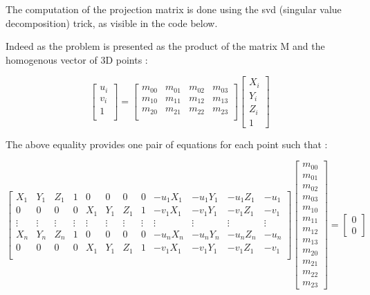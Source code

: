 \documentclass[a4paper,11pt]{article}
\begin{document}
The computation of the projection matrix is done using the svd (singular value decomposition) trick, as visible in the code below.

Indeed as the problem is presented as the product of the matrix M and the homogenous vector of 3D points : 

$$
\begin{bmatrix}
u_{i}  \\
v_{i}   \\
1  \\
\end{bmatrix} 
=
\begin{bmatrix}
m_{00} & m_{01}  & m_{02} & m_{03} \\
m_{10} & m_{11}  &  m_{12} & m_{13}  \\
m_{20} & m_{21}  & m_{22}  & m_{23} \\
\end{bmatrix}
\begin{bmatrix}
X_{i} \\
Y_{i}  \\
Z_{i}  \\
1
\end{bmatrix}
$$

The above equality provides one pair of equations for each point such that :

$$
\left[
\begin{array}{cccccccccccc}
X_1 & Y_1& Z_1 & 1 &   0    & 0     & 0     & 0 & -u_{1}X_{1} & -u_{1}Y_{1} & -u_{1}Z_{1} & -u_{1} \\
0    & 0      & 0     & 0  & X_1 & Y_1& Z_1 & 1 & -v_{1}X_{1} & -v_{1}Y_{1} & -v_{1}Z_{1} & -v_{1} \\
\vdots & \vdots & \vdots & \vdots & \vdots & \vdots   & \vdots & \vdots & \vdots & \vdots & \vdots & \vdots \\
X_n & Y_n& Z_n & 1 & 0 & 0 & 0 & 0 & -u_{n}X_{n} & -u_{n}Y_{n} & -u_{n}Z_{n} & -u_{n} \\
0      & 0 & 0 & 0 & X_1 & Y_1& Z_1 & 1 & -v_{1}X_{1} & -v_{1}Y_{1} & -v_{1}Z_{1} & -v_{1} \\
\end{array}
\right]
\begin{bmatrix}
m_{00} \\ m_{01}  \\ m_{02} \\ m_{03} \\
m_{10} \\ m_{11}  \\  m_{12} \\ m_{13}  \\
m_{20} \\ m_{21}  \\ m_{22}  \\ m_{23} 
\end{bmatrix}
=
\begin{bmatrix}
0  \\
0
\end{bmatrix}
$$
\end{document}
